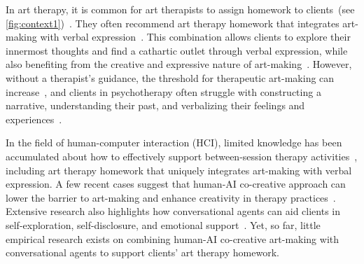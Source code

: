 In art therapy, it is common for art therapists to assign homework to clients~(see \autoref{fig:context1})~\cite{hoshino2011narrative}.
They often recommend art therapy homework that integrates art-making with verbal expression~\cite{smith2019visual,heckwolf2014coordinating,hoshino2011narrative}.
This combination allows clients to explore their innermost thoughts and find a cathartic outlet through verbal expression, while also benefiting from the creative and expressive nature of art-making~\cite{smith2019visual}. 
However, without a therapist's guidance, the threshold for therapeutic art-making can increase~\cite{du2024deepthink}, and clients in psychotherapy often struggle with constructing a narrative, understanding their past, and verbalizing their feelings and experiences~\cite{pennebaker1999forming,mayer2011emotional}.

In the field of human-computer interaction (HCI), limited knowledge has been accumulated about how to effectively support between-session therapy activities~\cite{Oewel_2024}, including art therapy homework that uniquely integrates art-making with verbal expression. 
A few recent cases suggest that human-AI co-creative approach can lower the barrier to art-making and enhance creativity in therapy practices~\cite{du2024deepthink, liu2024he}. 
Extensive research also highlights how conversational agents can aid clients in self-exploration, self-disclosure, and emotional support~\cite{kim2024mindfuldiary, park2021wrote, jo2023understanding, seo2024chacha}. 
Yet, so far, little empirical research exists on combining human-AI co-creative art-making with conversational agents to support clients' art therapy homework.



